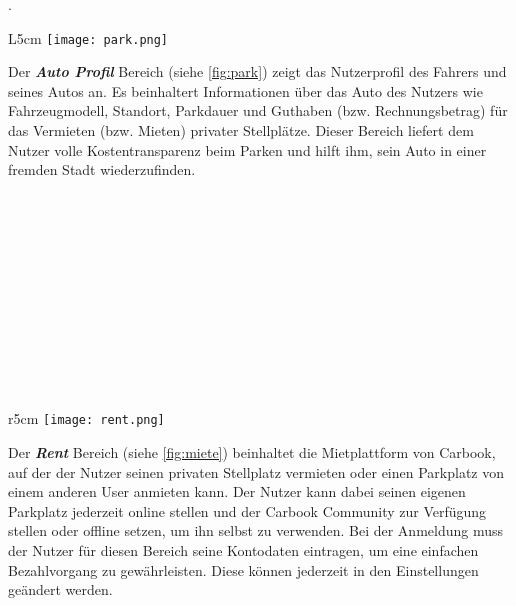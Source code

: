 \documentclass[12pt,ngerman, fleqn]{book} %
\begin{document}
. \linebreak \\[20]

\begin{wrapfigure}[8]{L}{5cm}%
\vspace{-75pt}
\centering
\texttt{[image: park.png]}
\caption{\label{fig:park} Profile screen.}
\end{wrapfigure}
Der \textbf{\textit{Auto Profil}} Bereich (siehe \ref{fig:park}) zeigt das Nutzerprofil des Fahrers und seines Autos an. Es beinhaltert Informationen über das Auto des Nutzers wie Fahrzeugmodell, Standort, Parkdauer und Guthaben (bzw. Rechnungsbetrag) für das Vermieten (bzw. Mieten) privater Stellplätze. Dieser Bereich liefert dem Nutzer volle Kostentransparenz beim Parken und hilft ihm, sein Auto in einer fremden Stadt wiederzufinden.\\ \\ \linebreak \\ \\ \\ \\ \\ \\ \\ \\ \\ \\

\begin{wrapfigure}[10]{r}{5cm}%
\vspace{-70pt}
\centering
\texttt{[image: rent.png]}
\caption{\label{fig:miete}Rent screen.}
\end{wrapfigure}


Der \textbf{\textit{Rent}} Bereich (siehe \ref{fig:miete}) beinhaltet die Mietplattform von Carbook, auf der der Nutzer seinen privaten Stellplatz vermieten oder einen Parkplatz von einem anderen User anmieten kann. Der Nutzer kann dabei seinen eigenen Parkplatz jederzeit online stellen und der Carbook Community zur Verfügung stellen oder offline setzen, um ihn selbst zu verwenden. Bei der Anmeldung muss der Nutzer für diesen Bereich seine Kontodaten eintragen, um eine einfachen Bezahlvorgang zu gewährleisten. Diese können jederzeit in den Einstellungen geändert werden. \newpage
\end{document}

